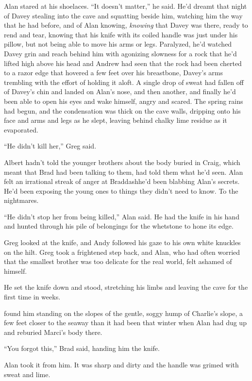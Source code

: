 Alan stared at his shoelaces.  ``It doesn't matter,'' he said.  He'd
dreamt that night of Davey stealing into the cave and squatting beside
him, watching him the way that he had before, and of Alan knowing,
\textit{knowing} that Davey was there, ready to rend and tear, knowing
that his knife with its coiled handle was just under his pillow, but
not being able to move his arms or legs.  Paralyzed, he'd watched
Davey grin and reach behind him with agonizing slowness for a rock
that he'd lifted high above his head and Andrew had seen that the rock
had been cherted to a razor edge that hovered a few feet over his
breastbone, Davey's arms trembling with the effort of holding it
aloft.  A single drop of sweat had fallen off of Davey's chin and
landed on Alan's nose, and then another, and finally he'd been able to
open his eyes and wake himself, angry and scared.  The spring rains
had begun, and the condensation was thick on the cave walls, dripping
onto his face and arms and legs as he slept, leaving behind chalky
lime residue as it evaporated.

``He didn't kill her,'' Greg said.

Albert hadn't told the younger brothers about the body buried in
Craig, which meant that Brad had been talking to them, had told them
what he'd seen.  Alan felt an irrational streak of anger at
Braddash{}he'd been blabbing Alan's secrets.  He'd been exposing the
young ones to things they didn't need to know.  To the nightmares.

``He didn't stop her from being killed,'' Alan said.  He had the knife
in his hand and hunted through his pile of belongings for the
whetstone to hone its edge.

Greg looked at the knife, and Andy followed his gaze to his own white
knuckles on the hilt.  Greg took a frightened step back, and Alan, who
had often worried that the smallest brother was too delicate for the
real world, felt ashamed of himself.

He set the knife down and stood, stretching his limbs and leaving the
cave for the first time in weeks.

 found him standing on the slopes of the gentle, soggy hump of
Charlie's slope, a few feet closer to the seaway than it had been that
winter when Alan had dug up and reburied Marci's body there.

``You forgot this,'' Brad said, handing him the knife.

Alan took it from him.  It was sharp and dirty and the handle was
grimed with sweat and lime.

